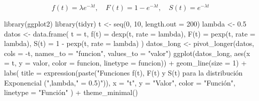 \documentclass[
  letterpaper,
  DIV=11,
  numbers=noendperiod]{scrartcl}
\newenvironment{Shaded}{\begin{snugshade}}{\end{snugshade}}
\newcommand{\AttributeTok}[1]{\textcolor[rgb]{0.40,0.45,0.13}{#1}}
\newcommand{\DecValTok}[1]{\textcolor[rgb]{0.68,0.00,0.00}{#1}}
\newcommand{\FloatTok}[1]{\textcolor[rgb]{0.68,0.00,0.00}{#1}}
\newcommand{\FunctionTok}[1]{\textcolor[rgb]{0.28,0.35,0.67}{#1}}
\newcommand{\NormalTok}[1]{\textcolor[rgb]{0.00,0.23,0.31}{#1}}
\newcommand{\OtherTok}[1]{\textcolor[rgb]{0.00,0.23,0.31}{#1}}
\newcommand{\SpecialCharTok}[1]{\textcolor[rgb]{0.37,0.37,0.37}{#1}}
\newcommand{\StringTok}[1]{\textcolor[rgb]{0.13,0.47,0.30}{#1}}
\begin{document}
\[
f(t) = \lambda e^{-\lambda t}, \quad F(t)=1-e^{-\lambda t}, \quad S(t) = e^{-\lambda t}
\]

\begin{Shaded}
\begin{Highlighting}[]
\FunctionTok{library}\NormalTok{(ggplot2)}
\FunctionTok{library}\NormalTok{(tidyr)}
\NormalTok{t }\OtherTok{\textless{}{-}} \FunctionTok{seq}\NormalTok{(}\DecValTok{0}\NormalTok{, }\DecValTok{10}\NormalTok{, }\AttributeTok{length.out =} \DecValTok{200}\NormalTok{)}
\NormalTok{lambda }\OtherTok{\textless{}{-}} \FloatTok{0.5}
\NormalTok{datos }\OtherTok{\textless{}{-}} \FunctionTok{data.frame}\NormalTok{(}
  \AttributeTok{t =}\NormalTok{ t,}
  \StringTok{\textasciigrave{}}\AttributeTok{f(t)}\StringTok{\textasciigrave{}} \OtherTok{=} \FunctionTok{dexp}\NormalTok{(t, }\AttributeTok{rate =}\NormalTok{ lambda),}
  \StringTok{\textasciigrave{}}\AttributeTok{F(t)}\StringTok{\textasciigrave{}} \OtherTok{=} \FunctionTok{pexp}\NormalTok{(t, }\AttributeTok{rate =}\NormalTok{ lambda),}
  \StringTok{\textasciigrave{}}\AttributeTok{S(t)}\StringTok{\textasciigrave{}} \OtherTok{=} \DecValTok{1} \SpecialCharTok{{-}} \FunctionTok{pexp}\NormalTok{(t, }\AttributeTok{rate =}\NormalTok{ lambda)}
\NormalTok{)}
\NormalTok{datos\_long }\OtherTok{\textless{}{-}} \FunctionTok{pivot\_longer}\NormalTok{(datos, }\AttributeTok{cols =} \SpecialCharTok{{-}}\NormalTok{t, }\AttributeTok{names\_to =} \StringTok{"funcion"}\NormalTok{, }\AttributeTok{values\_to =} \StringTok{"valor"}\NormalTok{)}
\FunctionTok{ggplot}\NormalTok{(datos\_long, }\FunctionTok{aes}\NormalTok{(}\AttributeTok{x =}\NormalTok{ t, }\AttributeTok{y =}\NormalTok{ valor, }\AttributeTok{color =}\NormalTok{ funcion, }\AttributeTok{linetype =}\NormalTok{ funcion)) }\SpecialCharTok{+}
  \FunctionTok{geom\_line}\NormalTok{(}\AttributeTok{size =} \DecValTok{1}\NormalTok{) }\SpecialCharTok{+}
  \FunctionTok{labs}\NormalTok{(}
    \AttributeTok{title =} \FunctionTok{expression}\NormalTok{(}\FunctionTok{paste}\NormalTok{(}\StringTok{"Funciones f(t), F(t) y S(t) para la distribución Exponencial ("}\NormalTok{,lambda,}\StringTok{" = 0.5)"}\NormalTok{)),}
    \AttributeTok{x =} \StringTok{"t"}\NormalTok{,}
    \AttributeTok{y =} \StringTok{"Valor"}\NormalTok{,}
    \AttributeTok{color =} \StringTok{"Función"}\NormalTok{,}
    \AttributeTok{linetype =} \StringTok{"Función"}
\NormalTok{  ) }\SpecialCharTok{+}
  \FunctionTok{theme\_minimal}\NormalTok{()}
\end{Highlighting}
\end{Shaded}
\end{document}
